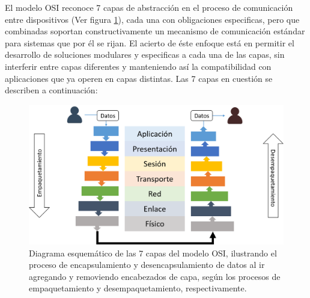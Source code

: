El modelo OSI reconoce 7 capas de abstracción en el proceso de comunicación entre dispositivos (Ver figura \ref{fig:osi7capas}), cada una con obligaciones especificas, pero que combinadas soportan constructivamente un mecanismo de comunicación estándar para sistemas que por él se rijan. El acierto de éste enfoque está en permitir el desarrollo de soluciones modulares y especificas a cada una de las capas, sin interferir entre capas diferentes y manteniendo así la compatibilidad con aplicaciones que ya operen en capas distintas. Las 7 capas en cuestión se describen a continuación:

\begin{figure}[!h]
	\centering
	\includegraphics[scale=.45]{imagenes/OSI7Capas.png}
	\caption{Diagrama esquemático de las 7 capas del modelo OSI, ilustrando el proceso de encapsulamiento y desencapsulamiento de datos al ir agregando y removiendo encabezados de capa, según los procesos de empaquetamiento y desempaquetamiento, respectivamente.}
	\label{fig:osi7capas}
\end{figure}


